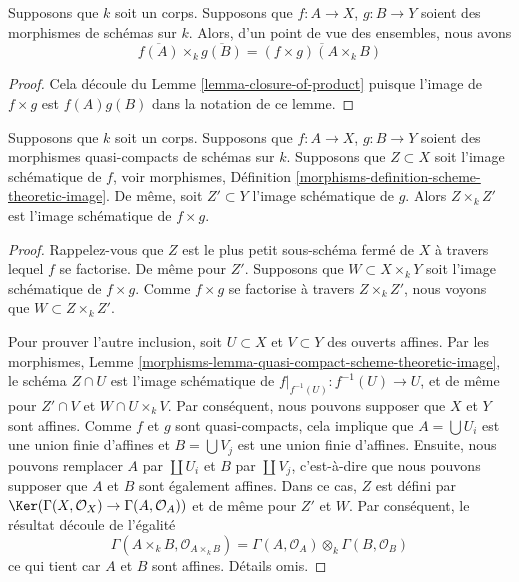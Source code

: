 \begin{lemma}
\label{lemma-closure-image-product-map}
Supposons que $k$ soit un corps. Supposons que $f : A
\to X$, $g : B \to Y$ soient des morphismes de schémas
sur $k$. Alors, d'un point de vue des ensembles, nous avons
$$
\overline{f(A)} \times_k \overline{g(B)} =
\overline{(f \times g)(A \times_k B)}
$$
\end{lemma}

\begin{proof}
Cela découle du Lemme
\ref{lemma-closure-of-product}
puisque l'image de $f \times g$ est
$f(A)g(B)$ dans la notation de ce lemme.
\end{proof}

\begin{lemma}
\label{lemma-scheme-theoretic-image-product-map}
Supposons que $k$ soit un corps. Supposons que $f : A \to X$, $g
: B \to Y$ soient des morphismes quasi-compacts de schémas sur
$k$. Supposons que $Z \subset X$ soit l'image schématique de $f$,
voir morphismes, Définition
\ref{morphisms-definition-scheme-theoretic-image}. De même, soit $Z' \subset Y$
l'image schématique de $g$. Alors $Z \times_k Z'$ est l'image schématique de $f \times g$.
\end{lemma}

\begin{proof}
Rappelez-vous que $Z$ est le plus petit sous-schéma fermé de $X$ à travers
lequel $f$ se factorise. De même pour $Z'$. Supposons que $W \subset X
\times_k Y$ soit l'image schématique de $f \times g$. Comme $f \times g$ se
factorise à travers $Z \times_k Z'$, nous voyons que $W \subset Z \times_k Z'$.

\medskip\noindent
Pour prouver l'autre inclusion, soit $U \subset X$ et $V
\subset Y$ des ouverts affines. Par les morphismes, Lemme
\ref{morphisms-lemma-quasi-compact-scheme-theoretic-image},
le schéma $Z \cap U$ est l'image schématique de
$f|_{f^{-1}(U)} : f^{-1}(U) \to U$, et de même pour $Z'
\cap V$ et $W \cap U \times_k V$. Par conséquent, nous
pouvons supposer que $X$ et $Y$ sont affines. Comme $f$ et
$g$ sont quasi-compacts, cela implique que $A = \bigcup
U_i$ est une union finie d'affines et $B = \bigcup V_j$ est
une union finie d'affines. Ensuite, nous pouvons remplacer
$A$ par $\coprod U_i$ et $B$ par $\coprod V_j$,
c'est-à-dire que nous pouvons supposer que $A$ et $B$ sont
également affines. Dans ce cas, $Z$ est défini par
$\Ker(\Gamma(X, \mathcal{O}_X) \to \Gamma(A, \mathcal{O}_A))$ et de
même pour $Z'$ et $W$. Par conséquent, le résultat découle de l'égalité
$$
\Gamma(A \times_k B, \mathcal{O}_{A \times_k B})
=
\Gamma(A, \mathcal{O}_A) \otimes_k \Gamma(B, \mathcal{O}_B)
$$
ce qui tient car $A$ et $B$ sont affines. Détails omis.
\end{proof}





